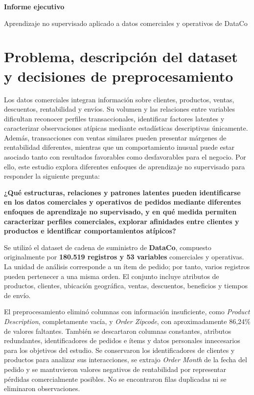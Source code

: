 \documentclass[11pt,a4paper]{article}
\begin{document}
{\LARGE\bfseries\color{azul} Informe ejecutivo}\par
{\small Aprendizaje no supervisado aplicado a datos comerciales y operativos de DataCo}

\section{Problema, descripción del dataset y decisiones de preprocesamiento}
Los datos comerciales integran información sobre clientes, productos, ventas, descuentos, rentabilidad y envíos. Su volumen y las relaciones entre variables dificultan reconocer perfiles transaccionales, identificar factores latentes y caracterizar observaciones atípicas mediante estadísticas descriptivas únicamente. Además, transacciones con ventas similares pueden presentar márgenes de rentabilidad diferentes, mientras que un comportamiento inusual puede estar asociado tanto con resultados favorables como desfavorables para el negocio. Por ello, este estudio explora diferentes enfoques de aprendizaje no supervisado para responder la siguiente pregunta:

\begingroup\leftskip=10pt\rightskip=10pt
\textbf{¿Qué estructuras, relaciones y patrones latentes pueden identificarse en los datos comerciales y operativos de pedidos mediante diferentes enfoques de aprendizaje no supervisado, y en qué medida permiten caracterizar perfiles comerciales, explorar afinidades entre clientes y productos e identificar comportamientos atípicos?}\par
\endgroup

Se utilizó el dataset de cadena de suministro de \textbf{DataCo}, compuesto originalmente por \textbf{180.519 registros y 53 variables} comerciales y operativas. La unidad de análisis corresponde a un ítem de pedido; por tanto, varios registros pueden pertenecer a una misma orden. El conjunto incluye atributos de productos, clientes, ubicación geográfica, ventas, descuentos, beneficios y tiempos de envío.

El preprocesamiento eliminó columnas con información insuficiente, como \textit{Product Description}, completamente vacía, y \textit{Order Zipcode}, con aproximadamente 86,24\% de valores faltantes. También se descartaron columnas constantes, atributos redundantes, identificadores de pedidos e ítems y datos personales innecesarios para los objetivos del estudio. Se conservaron los identificadores de clientes y productos para analizar sus interacciones, se extrajo \textit{Order Month} de la fecha del pedido y se mantuvieron valores negativos de rentabilidad por representar pérdidas comercialmente posibles. No se encontraron filas duplicadas ni se eliminaron observaciones.
\end{document}
